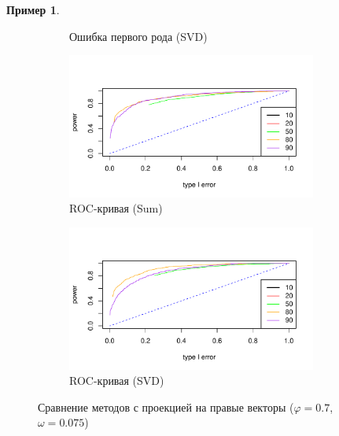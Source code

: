 \documentclass[specialist,
substylefile = spbu_report.rtx,
subf,href,colorlinks=true, 12pt]{disser}
\theoremstyle{definition}
\newtheorem{example}{Пример}
\begin{document}
\begin{example}
\begin{figure}[ht]
\begin{subfigure}[t]{0.5\textwidth}
		\caption{Ошибка первого рода (SVD)}
	\end{subfigure}
	\bigskip
	\begin{subfigure}[t]{0.5\textwidth}
		\centering
		\includegraphics[width=0.9\textwidth]{img/roc_sum_fa_omega0075.pdf}
		\caption{ROC-кривая (Sum)}
		\label{fig:sum_fa_r}
	\end{subfigure}\hspace{\fill}
	\begin{subfigure}[t]{0.5\textwidth}
		\centering
		\includegraphics[width=0.9\textwidth]{img/roc_mssa_fa.pdf}
		\caption{ROC-кривая (SVD)}
	\end{subfigure}
	\caption{Сравнение методов с проекцией на правые векторы ($\varphi=0.7$, $\omega=0.075$)}
	\label{fig:sum_fa}
\end{figure}


\end{example}
\end{document}
